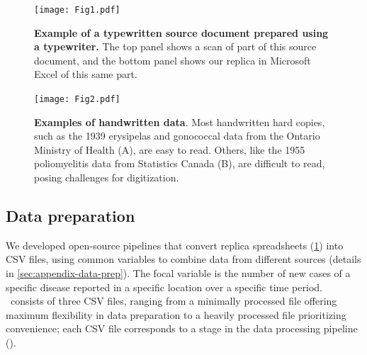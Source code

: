 \documentclass[12pt]{article}
\begin{document}
\begin{figure}[!ht]
  \texttt{[image: Fig1.pdf]}
  \caption{\textbf{Example of a typewritten source document prepared using a typewriter.} The top panel shows a scan of part of this source document, and the bottom panel shows our replica in Microsoft Excel of this same part.}
  \label{fig:typewritten-eg}
\end{figure}

\begin{figure}[!ht]
  \texttt{[image: Fig2.pdf]}
  \caption{\textbf{Examples of handwritten data}. Most handwritten hard copies, such as the 1939 erysipelas and gonococcal data from the Ontario Ministry of Health (A), are easy to read. Others, like the 1955 poliomyelitis data from Statistics Canada (B), are difficult to read, posing challenges for digitization.}
  \label{fig:handwritten-eg}
\end{figure}

\subsection{Data preparation}\label{sec:data-prep}

We developed open-source \cite{thibault2023open} pipelines that convert replica spreadsheets (\cref{fig:typewritten-eg}) into CSV files, using common variables to combine data from different sources (details in \cref{sec:appendix-data-prep}). The focal variable is the number of new cases of a specific disease reported in a specific location over a specific time period. \datacronym\ consists of three CSV files, ranging from a minimally processed file offering maximum flexibility in data preparation to a heavily processed file prioritizing convenience; each CSV file corresponds to a stage in the data processing pipeline ().
\end{document}
